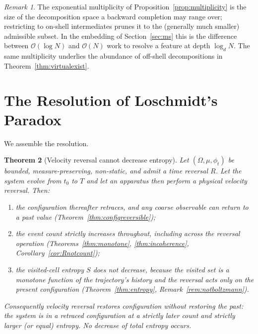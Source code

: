 \documentclass[11pt,a4paper]{article}
\theoremstyle{thmstyle}
\newtheorem{theorem}{Theorem}[section]
\theoremstyle{definition}
\theoremstyle{remark}
\newtheorem{remark}[theorem]{Remark}
\newcommand{\Tinv}{R}
\newcommand{\flow}{\phi}
\begin{document}
\begin{remark}
\label{rem:multiplicity}
The exponential multiplicity of Proposition~\ref{prop:multiplicity} is the
size of the decomposition space a backward completion may range over;
restricting to on-shell intermediates prunes it to the (generally much
smaller) admissible subset. In the embedding of Section~\ref{sec:ms} this
is the difference between $\mathcal{O}(\log N)$ and $\mathcal{O}(N)$ work
to resolve a feature at depth $\log_d N$. The same multiplicity underlies
the abundance of off-shell decompositions in
Theorem~\ref{thm:virtualexist}.
\end{remark}

\section{The Resolution of Loschmidt's Paradox}
\label{sec:resolution}

We assemble the resolution.

\begin{theorem}[Velocity reversal cannot decrease entropy]
\label{thm:resolution}
Let $(\Omega,\mu,\flow_t)$ be bounded, measure-preserving, non-static, and
admit a time reversal $\Tinv$. Let the system evolve from $t_0$ to $T$ and
let an apparatus then perform a physical velocity reversal. Then:
\begin{enumerate}[label=(\roman*),leftmargin=2em]
\item the configuration thereafter retraces, and any coarse observable can
return to a past value (Theorem~\ref{thm:configreversible});
\item the event count strictly increases throughout, including across the
reversal operation (Theorems~\ref{thm:monotone}, \ref{thm:incoherence},
Corollary~\ref{cor:Rnotcount});
\item the visited-cell entropy $S$ does not decrease, because the visited
set is a monotone function of the trajectory's history and the reversal
acts only on the present configuration (Theorem~\ref{thm:entropy},
Remark~\ref{rem:notboltzmann}).
\end{enumerate}
Consequently velocity reversal restores configuration without restoring
the past: the system is in a retraced configuration at a strictly later
count and strictly larger (or equal) entropy. No decrease of total entropy
occurs.
\end{theorem}
\end{document}
